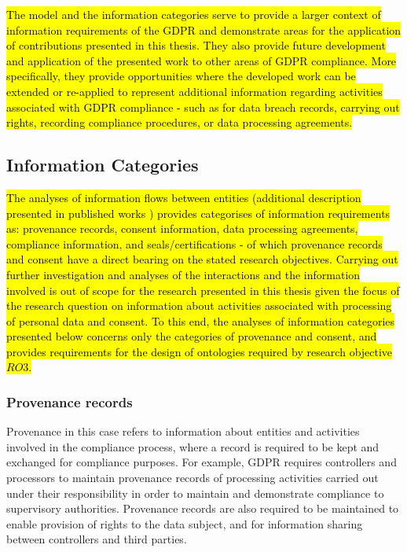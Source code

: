 \hl{The model and the information categories serve to provide a larger context of information requirements of the GDPR and demonstrate areas for the application of contributions presented in this thesis. They also provide future development and application of the presented work to other areas of GDPR compliance. More specifically, they provide opportunities where the developed work can be extended or re-applied to represent additional information regarding activities associated with GDPR compliance - such as for data breach records, carrying out rights, recording compliance procedures, or data processing agreements.
}

\subsection*{Information Categories}
\hl{The analyses of information flows between entities (additional description presented in published works \cite{pandit_exploration_2018,pandit_gdpr_2018}) provides categorises of information requirements as: provenance records, consent information, data processing agreements, compliance information, and seals/certifications - of which provenance records and consent have a direct bearing on the stated research objectives.
Carrying out further investigation and analyses of the interactions and the information involved is out of scope for the research presented in this thesis given the focus of the research question on information about activities associated with processing of personal data and consent.
To this end, the analyses of information categories presented below concerns only the categories of provenance and consent, and provides requirements for the design of ontologies required by research objective $RO3$.}

\subsubsection*{Provenance records}
Provenance in this case refers to information about entities and activities involved in the compliance process, where a record is required to be kept and exchanged for compliance purposes. For example, GDPR requires controllers and processors to maintain provenance records of processing activities carried out under their responsibility in order to maintain and demonstrate compliance to supervisory authorities. Provenance records are also required to be maintained to enable provision of rights to the data subject, and for information sharing between controllers and third parties.

